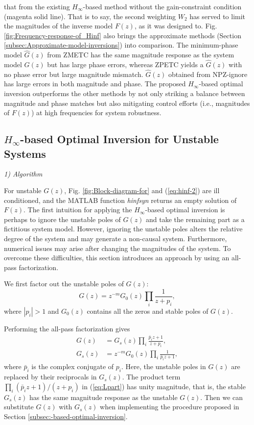 \documentclass [11pt, proquest] {uwthesis}[2020/02/24]
\begin{document}
that from the existing $H_{\infty}$-based method without the gain-constraint
condition (magenta solid line). That is to say, the second weighting
$W_{2}$ has served to limit the magnitudes of the inverse model $F(z)$,
as it was designed to. Fig. \ref{fig:Frequency-response-of_Hinf}
also brings the approximate methods (Section \ref{subsec:Approximate-model-inversions})
into comparison. The minimum-phase model $\hat{G}(z)$ from ZMETC
has the same magnitude response as the system model $G(z)$ but has
large phase errors, whereas ZPETC yields a $\hat{G}(z)$ with no phase
error but large magnitude mismatch. $\hat{G}(z)$ obtained from NPZ-ignore
has large errors in both magnitude and phase. The proposed $H_{\infty}$-based
optimal inversion outperforms the other methods by not only striking
a balance between magnitude and phase matches but also mitigating
control efforts (i.e., magnitudes of $F(z)$) at high frequencies
for system robustness.

\subsection{\label{subsec:-based-optimal-design}$H_{\infty}$-based Optimal
Inversion for Unstable Systems}

\noindent \emph{1) Algorithm}

For unstable $G(z)$, Fig. \ref{fig:Block-diagram-for} and (\ref{eq:hinf-2})
are ill conditioned, and the MATLAB function \emph{hinfsyn} returns
an empty solution of $F(z)$. The first intuition for applying the
$H_{\infty}$-based optimal inversion is perhaps to ignore the unstable
poles of $G(z)$ and take the remaining part as a fictitious system
model. However, ignoring the unstable poles alters the relative degree
of the system and may generate a non-causal system. Furthermore, numerical
issues may arise after changing the magnitudes of the system. To overcome
these difficulties, this section introduces an approach by using an
all-pass factorization.

We first factor out the unstable poles of $G(z)$:
\begin{equation}
G(z)=z^{-m}G_{0}(z)\prod_{i}\frac{1}{z+p_{i}},\label{eq:Lgen}
\end{equation}
where $|p_{i}|>1$ and $G_{0}(z)$ contains all the zeros and stable
poles of $G(z)$.

Performing the all-pass factorization gives
\begin{align}
G(z) & =G_{s}(z)\prod_{i}\frac{\bar{p}_{i}z+1}{z+p_{i}},\label{eq:Lpart}\\
G_{s}(z) & =z^{-m}G_{0}(z)\prod_{i}\frac{1}{\bar{p}_{i}z+1},\label{eq:G_tilde}
\end{align}
where $\bar{p}_{i}$ is the complex conjugate of $p_{i}$. Here, the
unstable poles in $G(z)$ are replaced by their reciprocals in $G_{s}(z)$.
The product term $\prod_{i}(\bar{p}_{i}z+1)/(z+p_{i})$ in (\ref{eq:Lpart})
has unity magnitude, that is, the stable $G_{s}(z)$ has the same
magnitude response as the unstable $G(z)$. Then we can substitute
$G(z)$ with $G_{s}(z)$ when implementing the procedure proposed
in Section \ref{subsec:-based-optimal-inversion}.
\end{document}
